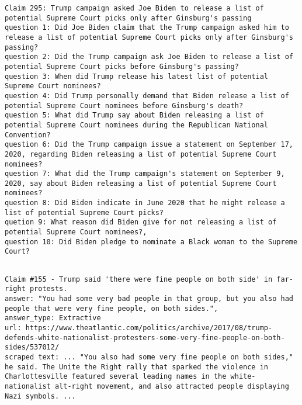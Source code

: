 \begin{lstlisting}[caption={Example of a claim and questions showing that the last tends to be unrelated or redundant to fact-checking of the claim.}, label={lst:unrelated_questions}, breaklines=true, breakatwhitespace=false, columns=fullflexible]
Claim 295: Trump campaign asked Joe Biden to release a list of potential Supreme Court picks only after Ginsburg's passing
question 1: Did Joe Biden claim that the Trump campaign asked him to release a list of potential Supreme Court picks only after Ginsburg's passing?
question 2: Did the Trump campaign ask Joe Biden to release a list of potential Supreme Court picks before Ginsburg's passing?
question 3: When did Trump release his latest list of potential Supreme Court nominees?
question 4: Did Trump personally demand that Biden release a list of potential Supreme Court nominees before Ginsburg's death?
question 5: What did Trump say about Biden releasing a list of potential Supreme Court nominees during the Republican National Convention?
question 6: Did the Trump campaign issue a statement on September 17, 2020, regarding Biden releasing a list of potential Supreme Court nominees?
question 7: What did the Trump campaign's statement on September 9, 2020, say about Biden releasing a list of potential Supreme Court nominees?
question 8: Did Biden indicate in June 2020 that he might release a list of potential Supreme Court picks?
quetion 9: What reason did Biden give for not releasing a list of potential Supreme Court nominees?,
question 10: Did Biden pledge to nominate a Black woman to the Supreme Court?
    
\end{lstlisting}

\begin{lstlisting}[caption={Example of a claim where our pipeline did not exactly extract the answer.}, label={lst:extractive_error}, breaklines=true, breakatwhitespace=false, columns=fullflexible]
Claim #155 - Trump said 'there were fine people on both side' in far-right protests.
answer: "You had some very bad people in that group, but you also had people that were very fine people, on both sides.", 
answer_type: Extractive
url: https://www.theatlantic.com/politics/archive/2017/08/trump-defends-white-nationalist-protesters-some-very-fine-people-on-both-sides/537012/
scraped text: ... "You also had some very fine people on both sides," he said. The Unite the Right rally that sparked the violence in Charlottesville featured several leading names in the white-nationalist alt-right movement, and also attracted people displaying Nazi symbols. ...

\end{lstlisting}